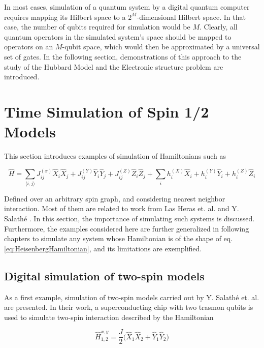   In most cases, simulation of a quantum system by a digital quantum computer requires mapping its Hilbert space to a $2^M$-dimensional Hilbert space. In that case, the number of qubits required for simulation would be $M$. Clearly, all quantum operators in the simulated system's space should be mapped to operators on an $M$-qubit space, which would then be approximated by a universal set of gates. In the following section, demonstrations of this approach to the study of the Hubbard Model and the Electronic structure problem are introduced.

\section{Time Simulation of Spin 1/2 Models}
\label{sec:hubbard}
  
  This section introduces examples of simulation of Hamiltonians such as

  \begin{equation}
    \hat{H} = \sum_{\langle i,j \rangle} J_{ij}^{(x)} \hat{X}_i \hat{X}_j + J_{ij}^{(Y)} \hat{Y}_i \hat{Y}_j + J_{ij}^{(Z)} \hat{Z}_i \hat{Z}_j + \sum_i h_i^{(X)} \hat{X}_i + h_i^{(Y)} \hat{Y}_i + h_i^{(Z)} \hat{Z}_i
    \label{eq:HeisenbergHamiltonian}
  \end{equation}

  Defined over an arbitrary spin graph, and considering nearest neighbor interaction. Most of them are related to work from Las Heras et. al. \cite{HubbardSimul,HubbardSimulLasHeras} and Y. Salathé \cite{HeisenbergSimulLasHeras}. In this section, the importance of simulating such systems is discussed. Furthermore, the examples considered here are further generalized in following chapters to simulate any system whose Hamiltonian is of the shape of eq. \ref{eq:HeisenbergHamiltonian}, and its limitations are exemplified.

  \subsection{Digital simulation of two-spin models}

  As a first example, simulation of two-spin models carried out by Y. Salathé et. al. \cite{HeisenbergSimulLasHeras} are presented. In their work, a superconducting chip with two trasmon qubits is used to simulate two-spin interaction described by the Hamiltonian

  \begin{equation}
    \hat{H}_{1,2}^{x,y} = \frac{J}{2} \bigg( \hat{X}_1 \hat{X}_2 + \hat{Y}_1 \hat{Y}_2 \bigg)
    \label{eq:fundamentalSlatheGate}
  \end{equation}

